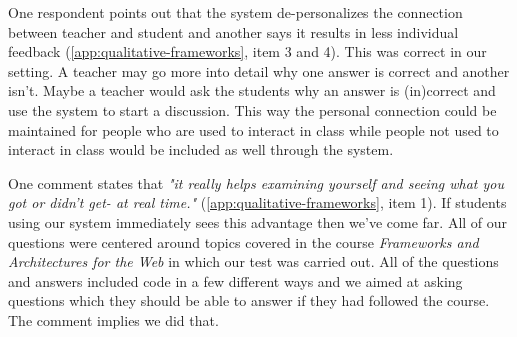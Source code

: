 One respondent points out that the system de-personalizes the connection between teacher and student and another says it results in less individual feedback (\ref{app:qualitative-frameworks}, item 3 and 4). This was correct in our setting. A teacher may go more into detail why one answer is correct and another isn't. Maybe a teacher would ask the students why an answer is (in)correct and use the system to start a discussion. This way the personal connection could be maintained for people who are used to interact in class while people not used to interact in class would be included as well through the system.

One comment states that \emph{"it really helps examining yourself and seeing what you got or didn't get- at real time."} (\ref{app:qualitative-frameworks}, item 1). If students using our system immediately sees this advantage then we've come far. All of our questions were centered around topics covered in the course \emph{Frameworks and Architectures for the Web} in which our test was carried out. All of the questions and answers included code in a few different ways and we aimed at asking questions which they should be able to answer if they had followed the course. The comment implies we did that. 


